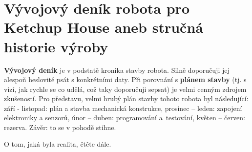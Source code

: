
\section{Vývojový deník robota pro Ketchup House aneb stručná historie výroby } \label{denik} 

\textbf{Vývojový deník} je v podstatě kronika stavby robota. Silně doporučuji jej alespoň heslovitě psát s konkrétními daty. 
Při porovnání s \textbf{plánem stavby} (tj. s vizí, jak rychle se co udělá, což taky doporučuji sepsat)  je velmi cenným zdrojem zkušeností. 
Pro představu, velmi hrubý plán stavby tohoto robota byl následující: září - listopad: plán a stavba mechanická konstrukce, prosinec -- leden: zapojení elektroniky a senzorů,
únor -- duben: programování a~testování, květen -- červen: rezerva. Závěr: to se v pohodě stihne. 

O tom, jaká byla realita, čtěte dále. 

